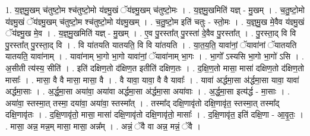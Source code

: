 \documentclass[17pt]{extarticle}
\begin{document}
1. य॒ज्ञ्॒मु॒खम् च॑तुष्टो॒म श्च॑तुष्टो॒मो य॑ज्ञ्मु॒खं ॅय॑ज्ञ्मु॒खम् च॑तुष्टो॒मः । . य॒ज्ञ्॒मु॒खमिति॑ यज्ञ् - मु॒खम् । . च॒तु॒ष्टो॒मो य॑ज्ञ्मु॒खं ॅय॑ज्ञ्मु॒खम् च॑तुष्टो॒म श्च॑तुष्टो॒मो य॑ज्ञ्मु॒खम् । . च॒तु॒ष्टो॒म इति॑ चतुः - स्तो॒मः । . य॒ज्ञ्॒मु॒ख मे॒वैव य॑ज्ञ्मु॒खं ॅय॑ज्ञ्मु॒ख मे॒व । . य॒ज्ञ्॒मु॒खमिति॑ यज्ञ् - मु॒खम् । . ए॒व पु॒रस्ता᳚त् पु॒रस्ता॑ दे॒वैव पु॒रस्ता᳚त् । . पु॒रस्ता॒द् वि वि पु॒रस्ता᳚त् पु॒रस्ता॒द् वि । . वि या॑तयति यातयति॒ वि वि या॑तयति । . या॒त॒य॒ति॒ यावा॑नां॒ ॅयावा॑नां ॅयातयति यातयति॒ यावा॑नाम् । . यावा॑नाम् भा॒गो भा॒गो यावा॑नां॒ ॅयावा॑नाम् भा॒गः । . भा॒गो᳚ ऽस्यसि भा॒गो भा॒गो॑ ऽसि । . अ॒सीती त्य॑स्य॒ सीति॑ । . इति॑ दक्षिण॒तो द॑क्षिण॒त इतीति॑ दक्षिण॒तः । . द॒क्षि॒ण॒तो मासा॒ मासा॑ दक्षिण॒तो द॑क्षिण॒तो मासाः᳚ । . मासा॒ वै वै मासा॒ मासा॒ वै । . वै यावा॒ यावा॒ वै वै यावाः᳚ । . यावा॑ अर्द्धमा॒सा अ॑र्द्धमा॒सा यावा॒ यावा॑ अर्द्धमा॒साः । . अ॒र्द्ध॒मा॒सा अया॑वा॒ अया॑वा अर्द्धमा॒सा अ॑र्द्धमा॒सा अया॑वाः । . अ॒र्द्ध॒मा॒सा इत्य॑र्द्ध - मा॒साः । . अया॑वा॒ स्तस्मा॒त् तस्मा॒ दया॑वा॒ अया॑वा॒ स्तस्मा᳚त् । . तस्मा᳚द् दक्षि॒णावृ॑तो दक्षि॒णावृ॑त॒ स्तस्मा॒त् तस्मा᳚द् दक्षि॒णावृ॑तः । . द॒क्षि॒णावृ॑तो॒ मासा॒ मासा॑ दक्षि॒णावृ॑तो दक्षि॒णावृ॑तो॒ मासाः᳚ । . द॒क्षि॒णावृ॑त॒ इति॑ दक्षि॒णा - आ॒वृ॒तः॒ । . मासा॒ अन्न॒ मन्न॒म् मासा॒ मासा॒ अन्न᳚म् । . अन्नं॒ ॅवै वा अन्न॒ मन्नं॒ ॅवै । \newline
\end{document}
